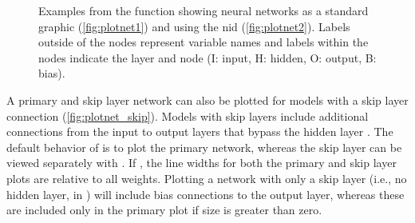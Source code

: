 \documentclass[article,shortnames]{jss}
\begin{document}
\begin{figure}[!ht]
\caption{Examples from the  function showing neural networks as a standard graphic (\ref{fig:plotnet1}) and using the \acl{nid} (\ref{fig:plotnet2}).  Labels outside of the nodes represent variable names and labels within the nodes indicate the layer and node (I: input, H: hidden, O: output, B: bias).}
\label{fig:plotnet}
\end{figure}

A primary and skip layer network can also be plotted for  models with a skip layer connection (\cref{fig:plotnet_skip}). Models with skip layers include additional connections from the input to output layers that bypass the hidden layer \citep{Ripley96}.  The default behavior of  is to plot the primary network, whereas the skip layer can be viewed separately with . If , the line widths for both the primary and skip layer plots are relative to all weights. Plotting a network with only a skip layer (i.e., no hidden layer,  in ) will include bias connections to the output layer, whereas these are included only in the primary plot if size is greater than zero.
\end{document}
